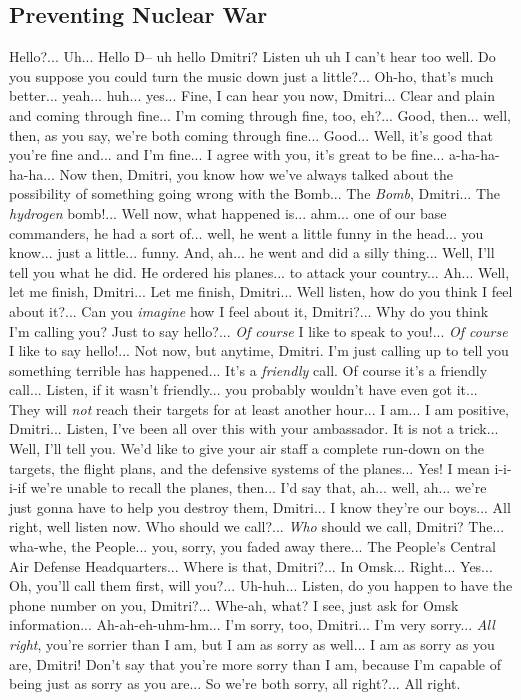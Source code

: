 \subsection{Preventing Nuclear War}
Hello?... Uh... Hello D-- uh hello Dmitri? Listen uh uh I can't hear too well. Do you suppose you could turn the music down just a little?... Oh-ho, that's much better... yeah... huh... yes... Fine, I can hear you now, Dmitri... Clear and plain and coming through fine... I'm coming through fine, too, eh?... Good, then... well, then, as you say, we're both coming through fine... Good... Well, it's good that you're fine and... and I'm fine... I agree with you, it's great to be fine... a-ha-ha-ha-ha... Now then, Dmitri, you know how we've always talked about the possibility of something going wrong with the Bomb... The \textit{Bomb}, Dmitri... The \textit{hydrogen} bomb!... Well now, what happened is... ahm... one of our base commanders, he had a sort of... well, he went a little funny in the head... you know... just a little... funny. And, ah... he went and did a silly thing... Well, I'll tell you what he did. He ordered his planes... to attack your country... Ah... Well, let me finish, Dmitri... Let me finish, Dmitri... Well listen, how do you think I feel about it?... Can you \textit{imagine} how I feel about it, Dmitri?... Why do you think I'm calling you? Just to say hello?... \textit{Of course} I like to speak to you!... \textit{Of course} I like to say hello!... Not now, but anytime, Dmitri. I'm just calling up to tell you something terrible has happened... It's a \textit{friendly} call. Of course it's a friendly call... Listen, if it wasn't friendly... you probably wouldn't have even got it... They will \textit{not} reach their targets for at least another hour... I am... I am positive, Dmitri... Listen, I've been all over this with your ambassador. It is not a trick... Well, I'll tell you. We'd like to give your air staff a complete run-down on the targets, the flight plans, and the defensive systems of the planes... Yes! I mean i-i-i-if we're unable to recall the planes, then... I'd say that, ah... well, ah... we're just gonna have to help you destroy them, Dmitri... I know they're our boys... All right, well listen now. Who should we call?... \textit{Who} should we call, Dmitri? The... wha-whe, the People... you, sorry, you faded away there... The People's Central Air Defense Headquarters... Where is that, Dmitri?... In Omsk... Right... Yes... Oh, you'll call them first, will you?... Uh-huh... Listen, do you happen to have the phone number on you, Dmitri?... Whe-ah, what? I see, just ask for Omsk information... Ah-ah-eh-uhm-hm... I'm sorry, too, Dmitri... I'm very sorry... \textit{All right}, you're sorrier than I am, but I am as sorry as well... I am as sorry as you are, Dmitri! Don't say that you're more sorry than I am, because I'm capable of being just as sorry as you are... So we're both sorry, all right?... All right. 

